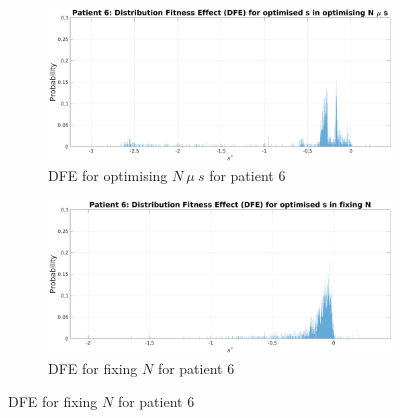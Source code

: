 \documentclass[12pt]{article}
\begin{document}
\begin{figure}[H]
    \centering
    
    \begin{subfigure}{1\textwidth}
        \includegraphics[width=\linewidth]{figures/patient/pt6/pt6_DFE_s.eps}
        \caption{DFE for optimising $N\ \mu\ s$ for patient 6}
        \label{fig:subfig1}
    \end{subfigure}
    
    \begin{subfigure}{1\textwidth}
        \includegraphics[width=\linewidth]{figures/patient/pt6/pt6_fixN_DFE_s.eps}
        \caption{DFE for fixing $N$ for patient 6}
        \label{fig:subfig2}
    \end{subfigure}
     \end{figure}
\end{document}
